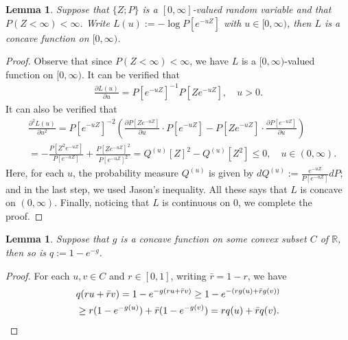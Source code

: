\documentclass[12pt,a4paper]{amsart}
\numberwithin{equation}{section}
\theoremstyle{plain}
\newtheorem{lem}[thm]{Lemma}
\theoremstyle{definition}
\begin{document}
\begin{lem}
  \label{lem:PSC}
  Suppose that $\{Z; P\}$ is a $[0,\infty]$-valued random variable and that $P(Z < \infty)< \infty$. 
  Write $L(u):= - \log P[e^{- u Z}]$ with $u \in [0,\infty)$, then $L$ is a concave function on $[0,\infty)$.
\end{lem} 
\begin{proof}
  Observe that since $P(Z < \infty)< \infty$, we have $L$ is a $[0,\infty)$-valued function on $[0,\infty)$.
	It can be verified that
  \begin{align}
    \frac{\partial L(u)}{\partial u} = P[e^{-u Z}]^{-1} P[Ze^{- u Z}]
    , \quad u > 0.
  \end{align}
  It can also be verified that
  \begin{align}
    & \frac{\partial^2 L(u)}{\partial u^2}
    = P[e^{-uZ}]^{-2}( \frac{\partial P[Ze^{-uZ}]}{\partial u} \cdot P[e^{-uZ}] - P[Ze^{-uZ}] \cdot \frac{\partial P[e^{-uZ}]}{\partial u}) \\
    & = - \frac{P[Z^2 e^{-uZ}]}{P[e^{-uZ}]} + \frac{P[Ze^{-uZ}]^2}{P[e^{-uZ}]^2} 
= Q^{(u)}[Z]^2 - Q^{(u)}[Z^2] 
      \leq 0
      , \quad u \in (0,\infty).
  \end{align}
  Here, for each $u$, the probability measure $Q^{(u)}$ is given by $dQ^{(u)}:= \frac{e^{-uZ}}{P[e^{-uZ}]} dP$; and in the last step, we used Jason's inequality.
  All these says that $L$ is concave on $(0,\infty)$.
  Finally, noticing that $L$ is continuous on $0$, we complete the proof.
\end{proof}
\begin{lem}
	\label{lem:ACE}
  Suppose that $g$ is a concave function on some convex subset $C$ of $\mathbb R$, then so is $q:= 1- e^{-g}$.
\end{lem}

\begin{proof}
For each $u,v \in C$ and $r \in [0,1]$, writing $\bar r = 1-r$, we have
\begin{align}
	&q(ru+\bar r v) 
  = 1 - e^{- g(ru + \bar r v)}
  \geq 1 - e^{- ( r g(u) + \bar r g(v))} \\
  & \geq r(1- e^{- g(u)}) + \bar r (1 - e^{- g(v)})
    = rq(u) + \bar r q(v).
    \qedhere
\end{align}	
\end{proof}



\end{document}
